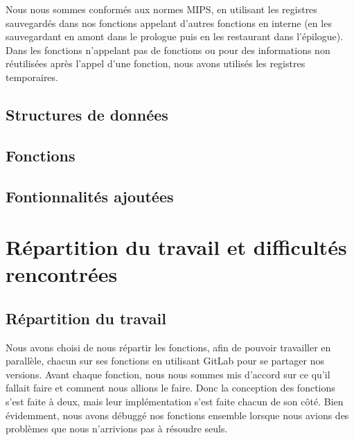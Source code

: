 \documentclass[a4paper]{article}
\begin{document}
Nous nous sommes conformés aux normes MIPS, en utilisant les registres sauvegardés
dans nos fonctions appelant d'autres fonctions en interne (en les sauvegardant en amont dans le prologue puis en les restaurant dans l'épilogue).
Dans les fonctions n'appelant pas de fonctions ou pour des informations non réutilisées après l'appel d'une fonction,
nous avons utilisés les registres temporaires.

\subsection{Structures de données}

\subsection{Fonctions}

\subsection{Fontionnalités ajoutées}

\section{Répartition du travail et difficultés rencontrées}

\subsection{Répartition du travail}
Nous avons choisi de nous répartir les fonctions, afin de pouvoir travailler en parallèle, chacun sur ses fonctions en utilisant GitLab pour se partager nos versions.
Avant chaque fonction, nous nous sommes mis d'accord sur ce qu'il fallait faire et comment nous allions le faire. Donc la conception des fonctions s'est faite à deux, mais
leur implémentation s'est faite chacun de son côté. Bien évidemment, nous avons débuggé nos fonctions ensemble lorsque nous avions des problèmes que nous n'arrivions pas à résoudre
seuls.
\end{document}
